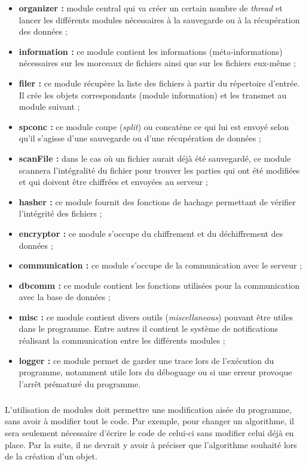 \documentclass[a4paper,10pt, twoside]{report}
\begin{document}
\begin{spacing}{1.2}
\begin{itemize}
  \item \textbf{organizer :} module central qui va créer un certain nombre de
  \textit{thread} et lancer les différents modules nécessaires à la sauvegarde
  ou à la récupération des données ; \item \textbf{information :} ce module
  contient les informations (méta-informations) nécessaires sur les morceaux
  de fichiers ainsi que sur les fichiers eux-même ;
  \item \textbf{filer :} ce module récupère la liste des fichiers à partir du
  répertoire d'entrée. Il crée les objets correspondants (module information)
  et les transmet au module suivant ; \item \textbf{spconc :} ce module coupe
  (\textit{split}) ou concatène ce qui lui est envoyé selon qu'il s'agisse
  d'une sauvegarde ou d'une récupération de données ;
  \item \textbf{scanFile :} dans le cas où un fichier aurait déjà été
  sauvegardé, ce module scannera l'intégralité du fichier pour trouver les
  parties qui ont été modifiées et qui doivent être chiffrées et envoyées au
  serveur ;
  \item \textbf{hasher :} ce module fournit des fonctions de hachage permettant
  de vérifier l'intégrité des fichiers ;
  \item \textbf{encryptor :} ce module s'occupe du chiffrement et du
  déchiffrement des données ;
  \item \textbf{communication :} ce module s'occupe de la communication avec le
  serveur ;
  \item \textbf{dbcomm :} ce module contient les fonctions utilisées pour la
  communication avec la base de données ;
  \item \textbf{misc :} ce module contient divers outils
  (\textit{miscellaneous}) pouvant être utiles dans le programme. Entre autres
  il contient le système de notifications réalisant la communication entre les
  différents modules ;
  \item \textbf{logger :} ce module permet de garder une trace lors de
  l'exécution du programme, notamment utile lors du déboguage ou si une erreur
  provoque l'arrêt prématuré du programme.
\end{itemize}

\subparagraph{}
L'utilisation de modules doit permettre une modification aisée du programme,
sans avoir à modifier tout le code. Par exemple, pour changer un algorithme,
il sera seulement nécessaire d'écrire le code de celui-ci sans modifier celui
déjà en place. Par la suite, il ne devrait y avoir à préciser que l'algorithme
souhaité lors de la création d'un objet.


\end{spacing}
\end{document}
